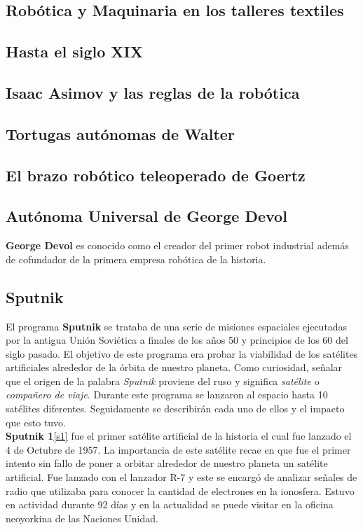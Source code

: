 \documentclass[paper=a4, fontsize=11pt]{scrartcl}
\begin{document}
\subsection{Robótica y Maquinaria en los talleres textiles}

\subsection{Hasta el siglo XIX}

\subsection{Isaac Asimov y las reglas de la robótica}

\subsection{Tortugas autónomas de Walter}

\subsection{El brazo robótico teleoperado de Goertz}

\subsection{Autónoma Universal de George Devol}

\textbf{George Devol} es conocido como el creador del primer robot industrial además de cofundador de la primera empresa robótica de la historia.

\subsection{Sputnik}

El programa \textbf{Sputnik} se trataba de una serie de misiones espaciales ejecutadas por la antigua Unión Soviética a finales de los años 50 y principios de los 60 del siglo pasado. El objetivo de este programa era probar la viabilidad de los satélites artificiales alrededor de la órbita de nuestro planeta.
Como curiosidad, señalar que el origen de la palabra \textit{Sputnik} proviene del ruso y significa \textit{satélite} o \textit{compañero de viaje}.
Durante este programa se lanzaron al espacio hasta 10 satélites diferentes. Seguidamente se describirán cada uno de ellos y el impacto que esto tuvo.\\


\textbf{Sputnik 1}\ref{s1} fue el primer satélite artificial de la historia el cual fue lanzado el 4 de Octubre de 1957. La importancia de este satélite recae en que fue el primer intento sin fallo de poner a orbitar alrededor de nuestro planeta un satélite artificial. Fue lanzado con el lanzador R-7 y este se encargó de analizar señales de radio que utilizaba para conocer la cantidad de electrones en la ionosfera. Estuvo en actividad durante 92 días y en la actualidad se puede visitar en la oficina neoyorkina de las Naciones Unidad.\\ 
\end{document}
